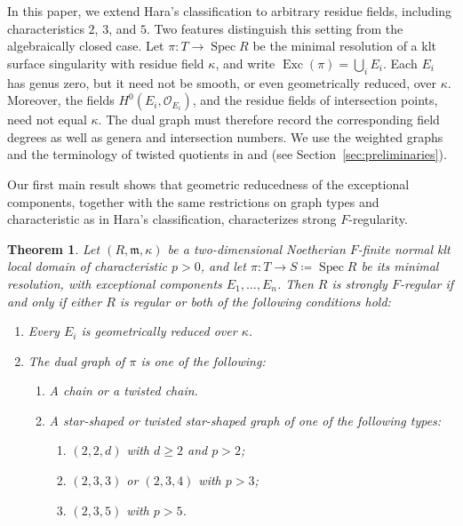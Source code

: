\documentclass[12pt]{amsart}
\def\Spec{\operatorname{Spec}}
\def\Exc{\operatorname{Exc}}
\def\m{{\mathfrak m}}
\newcommand{\sO}{\mathcal{O}}
\theoremstyle{plain}
\theoremstyle{definition}
\theoremstyle{remark}
\newtheorem{defn and notation}[thm]{Definition and Notation}
\theoremstyle{plain}
\newtheorem{theo}{Theorem}
\numberwithin{equation}{thm}
\begin{document}
In this paper, we extend Hara's classification to arbitrary residue fields, including characteristics $2$, $3$, and $5$. Two features distinguish this setting from the algebraically closed case. Let $\pi\colon T\to \Spec R$ be the minimal resolution of a klt surface singularity with residue field $\kappa$, and write $\Exc(\pi)=\bigcup_i E_i$. Each $E_i$ has genus zero, but it need not be smooth, or even geometrically reduced, over $\kappa$. Moreover, the fields $H^0(E_i,\sO_{E_i})$, and the residue fields of intersection points, need not equal $\kappa$. The dual graph must therefore record the corresponding field degrees as well as genera and intersection numbers. We use the weighted graphs and the terminology of twisted quotients in \cite[Section 3.3]{Kol13} and \cite[Appendix A]{Sato23} (see Section~\ref{sec:preliminaries}).

Our first main result shows that geometric reducedness of the exceptional components, together with the same restrictions on graph types and characteristic as in Hara's classification, characterizes strong $F$-regularity.

\begin{theo}\label{Introthm:classification of SFR}
Let $(R,\m,\kappa)$ be a two-dimensional Noetherian $F$-finite normal klt local domain of characteristic $p>0$, and let $\pi\colon T\to S\coloneqq\Spec R$ be its minimal resolution, with exceptional components $E_1, \dots, E_n$.
Then $R$ is strongly $F$-regular if and only if either $R$ is regular or both of the following conditions hold:
\begin{enumerate}[label=\textup{(\Alph*)}]
\item Every $E_i$ is geometrically reduced over $\kappa$.
\item The dual graph of $\pi$ is one of the following:
\begin{enumerate}[label=\textup{(\arabic*)}]
\item A chain or a twisted chain.
\item A star-shaped or twisted star-shaped graph of one of the following types:
\begin{enumerate}[label=\textup{(\roman*)}]
\item $(2,2,d)$ with $d\geq2$ and $p>2$;
\item $(2,3,3)$ or $(2,3,4)$ with $p>3$;
\item $(2,3,5)$ with $p>5$.
\end{enumerate}
\end{enumerate}
\end{enumerate}
\end{theo}
\end{document}

